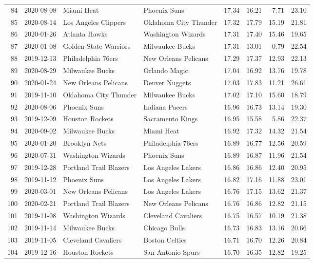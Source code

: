 \documentclass[
  11pt,
]{article}
\theoremstyle{nonumberplain}
\begin{document}
\begin{longtable}{rl|llr|rrr}
84 & 2020-08-08 & Miami Heat & Phoenix Suns & 17.34 & 16.21 & 7.71 & 23.10\\
85 & 2020-08-14 & Los Angeles Clippers & Oklahoma City Thunder & 17.32 & 17.79 & 15.19 & 21.81\\
86 & 2020-01-26 & Atlanta Hawks & Washington Wizards & 17.31 & 17.40 & 15.46 & 19.65\\
87 & 2020-01-08 & Golden State Warriors & Milwaukee Bucks & 17.31 & 13.01 & 0.79 & 22.54\\
88 & 2019-12-13 & Philadelphia 76ers & New Orleans Pelicans & 17.29 & 17.37 & 12.93 & 22.13\\
89 & 2020-08-29 & Milwaukee Bucks & Orlando Magic & 17.04 & 16.92 & 13.76 & 19.78\\
90 & 2020-01-24 & New Orleans Pelicans & Denver Nuggets & 17.03 & 17.83 & 11.21 & 26.61\\
91 & 2019-11-10 & Oklahoma City Thunder & Milwaukee Bucks & 17.02 & 17.10 & 15.60 & 18.79\\
92 & 2020-08-06 & Phoenix Suns & Indiana Pacers & 16.96 & 16.73 & 13.14 & 19.30\\
93 & 2019-12-09 & Houston Rockets & Sacramento Kings & 16.95 & 15.58 & 5.86 & 22.37\\
94 & 2020-09-02 & Milwaukee Bucks & Miami Heat & 16.92 & 17.32 & 14.32 & 21.54\\
95 & 2020-01-20 & Brooklyn Nets & Philadelphia 76ers & 16.89 & 16.77 & 12.56 & 20.59\\
96 & 2020-07-31 & Washington Wizards & Phoenix Suns & 16.89 & 16.87 & 11.96 & 21.54\\
97 & 2019-12-28 & Portland Trail Blazers & Los Angeles Lakers & 16.86 & 16.86 & 12.40 & 20.95\\
98 & 2019-11-12 & Phoenix Suns & Los Angeles Lakers & 16.82 & 17.16 & 11.88 & 23.01\\
99 & 2020-03-01 & New Orleans Pelicans & Los Angeles Lakers & 16.76 & 17.15 & 13.62 & 21.37\\
100 & 2020-02-21 & Portland Trail Blazers & New Orleans Pelicans & 16.76 & 16.86 & 12.82 & 21.15\\
101 & 2019-11-08 & Washington Wizards & Cleveland Cavaliers & 16.75 & 16.57 & 10.19 & 21.38\\
102 & 2019-11-14 & Milwaukee Bucks & Chicago Bulls & 16.73 & 16.83 & 13.16 & 20.66\\
103 & 2019-11-05 & Cleveland Cavaliers & Boston Celtics & 16.71 & 16.70 & 12.26 & 20.84\\
104 & 2019-12-16 & Houston Rockets & San Antonio Spurs & 16.70 & 16.35 & 12.82 & 19.25\\

\end{longtable}
\end{document}
